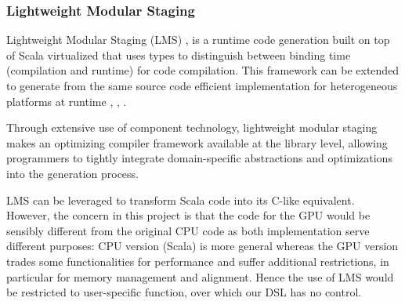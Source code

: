 \subsubsection{Lightweight Modular Staging}
Lightweight Modular Staging (LMS) \cite{lms}, \cite{lms_thesis} is a runtime code generation built on top of Scala virtualized \cite{scala_virtualized} that uses types to distinguish between binding time (compilation and runtime) for code compilation. This framework can be extended to generate from the same source code efficient implementation for heterogeneous platforms at runtime \cite{lms2}, \cite{lms3}, \cite{delite}.

 Through extensive use of component technology, lightweight modular staging makes an optimizing compiler framework available at the library level, allowing programmers to tightly integrate domain-specific abstractions and optimizations into the generation process.

LMS can be leveraged to transform Scala code into its C-like equivalent. However, the concern in this project is that the code for the GPU would be sensibly different from the original CPU code as both implementation serve different purposes: CPU version (Scala) is more general whereas the GPU version trades some functionalities for performance and suffer additional restrictions, in particular for memory management and alignment. Hence the use of LMS would be restricted to user-specific function, over which our DSL has no control.
